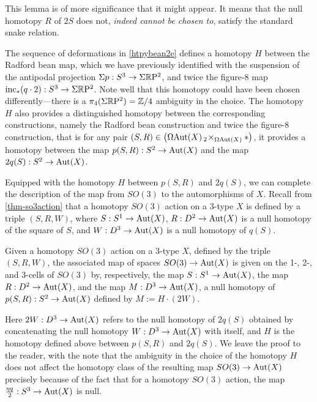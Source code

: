 \documentclass{amsart}
\begin{document}
\begin{remark}
This lemma is of more significance that it might appear.  It means that the null homotopy $R$ of $2S$ does not, \emph{indeed cannot be chosen to}, satisfy the standard snake relation.
\end{remark}
The sequence of deformations in \cref{htpybean2e} defines a homotopy $H$ between the Radford bean map, which we have previously identified with the suspension of the antipodal projection $\Sigma p : S^3 \rightarrow \Sigma \mathbb R \mathrm{P}^2$, and twice the figure-8 map $\mathrm{inc}_*(q \cdot 2) : S^3 \rightarrow \Sigma \mathbb R \mathrm{P}^2$.  Note well that this homotopy could have been chosen differently---there is a $\pi_4(\Sigma\mathbb R \mathrm{P}^2) = \mathbb Z/4$ ambiguity in the choice.  The homotopy $H$ also provides a distinguished homotopy between the corresponding constructions, namely the Radford bean construction and twice the figure-8 construction, that is for any pair $(S, R) \in \left(\Omega\mathrm{Aut}(X) \,_2\! \times_{\Omega\mathrm{Aut}(X)} \ast\right)$, it provides a homotopy between the map $p(S,R): S^2 \rightarrow \mathrm{Aut}(X)$ and the map $2 q(S): S^2 \rightarrow \mathrm{Aut}(X)$.

Equipped with the homotopy $H$ between $p(S,R)$ and $2 q(S)$, we can complete the description of the map from $SO(3)$ to the automorphisms of $X$.  Recall from \cref{thm-so3action} that a homotopy $SO(3)$ action on a 3-type $X$ is defined by a triple $(S,R,W)$, where $S: S^1 \rightarrow \mathrm{Aut}(X)$, $R: D^2 \rightarrow \mathrm{Aut}(X)$ is a null homotopy of the square of $S$, and $W: D^3 \rightarrow \mathrm{Aut}(X)$ is a null homotopy of $q(S)$.
\begin{proposition} 
\label{prop-so3map}
Given a homotopy $SO(3)$ action on a 3-type $X$, defined by the triple $(S,R,W)$, the associated map of spaces $SO(3) \rightarrow \mathrm{Aut}(X)$ is given on the 1-, 2-, and 3-cells of $SO(3)$ by, respectively, the map $S: S^1 \rightarrow \mathrm{Aut}(X)$, the map $R: D^2 \rightarrow \mathrm{Aut}(X)$, and the map $M: D^3 \rightarrow \mathrm{Aut}(X)$, a null homotopy of $p(S,R): S^2 \rightarrow \mathrm{Aut}(X)$ defined by $M:=H \cdot (2 W)$.
\end{proposition}
\nid Here $2 W: D^3 \rightarrow \mathrm{Aut}(X)$ refers to the null homotopy of $2 q(S)$ obtained by concatenating the null homotopy $W: D^3 \rightarrow \mathrm{Aut}(X)$ with itself, and $H$ is the homotopy defined above between $p(S,R)$ and $2 q(S)$.  We leave the proof to the reader, with the note that the ambiguity in the choice of the homotopy $H$ does not affect the homotopy class of the resulting map $SO(3) \rightarrow \mathrm{Aut}(X)$ precisely because of the fact that for a homotopy $SO(3)$ action, the map $\frac{\eta q}{2}: S^3 \rightarrow \mathrm{Aut}(X)$ is null. 
\end{document}
